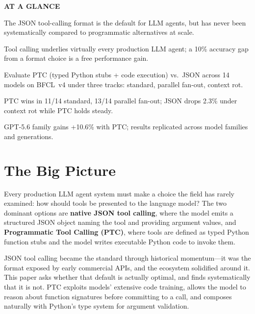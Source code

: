 \documentclass[10pt,twocolumn]{article}
\begin{document}
\begin{mdframed}[backgroundcolor=boxgray,linecolor=rulered,linewidth=1pt,
    innerleftmargin=6pt,innerrightmargin=6pt,
    innertopmargin=6pt,innerbottommargin=6pt]
\textbf{\small AT A GLANCE}\par\vspace{4pt}
\begin{description}[leftmargin=0pt,labelsep=4pt,itemsep=2pt,parsep=0pt,
    font=\small\bfseries]
  \item[Problem:] The JSON tool-calling format is the default for LLM agents,
    but has never been systematically compared to programmatic alternatives at scale.
  \item[Why it matters:] Tool calling underlies virtually every production LLM agent;
    a 10\% accuracy gap from a format choice is a free performance gain.
  \item[Method:] Evaluate PTC (typed Python stubs + code execution) vs.\ JSON across
    14 models on BFCL~v4 under three tracks: standard, parallel fan-out, context rot.
  \item[Result:] PTC wins in 11/14 standard, 13/14 parallel fan-out; JSON drops 2.3\%
    under context rot while PTC holds steady.
  \item[Evidence:] GPT-5.6 family gains +10.6\% with PTC; results replicated across
    model families and generations.
\end{description}
\end{mdframed}

\section{The Big Picture}

Every production LLM agent system must make a choice the field has rarely examined:
how should tools be presented to the language model? The two dominant options are
\textbf{native JSON tool calling}, where the model emits a structured JSON object
naming the tool and providing argument values, and \textbf{Programmatic Tool Calling
(PTC)}, where tools are defined as typed Python function stubs and the model writes
executable Python code to invoke them.

JSON tool calling became the standard through historical momentum---it was the
format exposed by early commercial APIs, and the ecosystem solidified around it.
This paper asks whether that default is actually optimal, and finds systematically
that it is not. PTC exploits models' extensive code training, allows the model to
reason about function signatures before committing to a call, and composes naturally
with Python's type system for argument validation.
\end{document}
